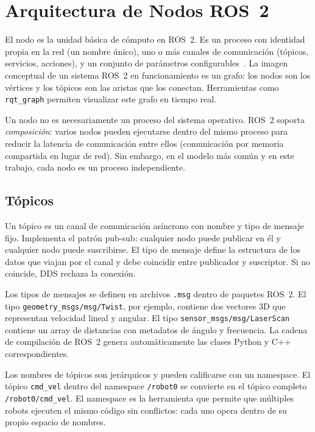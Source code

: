 \section{Arquitectura de Nodos ROS~2}

El nodo es la unidad básica de cómputo en ROS~2. Es un proceso con identidad propia en la red (un nombre único), uno o más canales de comunicación (tópicos, servicios, acciones), y un conjunto de parámetros configurables~\cite{ros2humble}. La imagen conceptual de un sistema ROS~2 en funcionamiento es un grafo: los nodos son los vértices y los tópicos son las aristas que los conectan. Herramientas como \texttt{rqt\_graph} permiten visualizar este grafo en tiempo real.

Un nodo no es necesariamente un proceso del sistema operativo. ROS~2 soporta \textit{composición}: varios nodos pueden ejecutarse dentro del mismo proceso para reducir la latencia de comunicación entre ellos (comunicación por memoria compartida en lugar de red). Sin embargo, en el modelo más común y en este trabajo, cada nodo es un proceso independiente.

\subsection{Tópicos}

Un tópico es un canal de comunicación asíncrono con nombre y tipo de mensaje fijo. Implementa el patrón pub-sub: cualquier nodo puede publicar en él y cualquier nodo puede suscribirse. El tipo de mensaje define la estructura de los datos que viajan por el canal y debe coincidir entre publicador y suscriptor. Si no coincide, DDS rechaza la conexión.

Los tipos de mensajes se definen en archivos \texttt{.msg} dentro de paquetes ROS~2. El tipo \texttt{geometry\_msgs/msg/Twist}, por ejemplo, contiene dos vectores 3D que representan velocidad lineal y angular. El tipo \texttt{sensor\_msgs/msg/LaserScan} contiene un array de distancias con metadatos de ángulo y frecuencia. La cadena de compilación de ROS~2 genera automáticamente las clases Python y C++ correspondientes.

Los nombres de tópicos son jerárquicos y pueden calificarse con un namespace. El tópico \texttt{cmd\_vel} dentro del namespace \texttt{/robot0} se convierte en el tópico completo \texttt{/robot0/cmd\_vel}. El namespace es la herramienta que permite que múltiples robots ejecuten el mismo código sin conflictos: cada uno opera dentro de su propio espacio de nombres.

